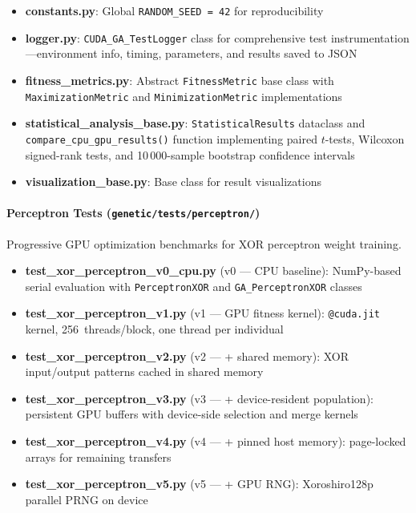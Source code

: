 \documentclass[a4paper,14pt]{extarticle}
\begin{document}
\begin{itemize}
  \item \textbf{constants.py}: Global \texttt{RANDOM\_SEED = 42} for reproducibility
  \item \textbf{logger.py}: \texttt{CUDA\_GA\_TestLogger} class for comprehensive test
        instrumentation---environment info, timing, parameters, and results saved to JSON
  \item \textbf{fitness\_metrics.py}: Abstract \texttt{FitnessMetric} base class with
        \texttt{MaximizationMetric} and \texttt{MinimizationMetric} implementations
  \item \textbf{statistical\_analysis\_base.py}: \texttt{StatisticalResults} dataclass and
        \texttt{compare\_cpu\_gpu\_results()} function implementing paired $t$-tests,
        Wilcoxon signed-rank tests, and 10\,000-sample bootstrap confidence intervals
  \item \textbf{visualization\_base.py}: Base class for result visualizations
\end{itemize}

\paragraph{Perceptron Tests (\texttt{genetic/tests/perceptron/})}

Progressive GPU optimization benchmarks for XOR perceptron weight training.

\begin{itemize}
  \item \textbf{test\_xor\_perceptron\_v0\_cpu.py} (v0 --- CPU baseline): NumPy-based serial
        evaluation with \texttt{PerceptronXOR} and \texttt{GA\_PerceptronXOR} classes
  \item \textbf{test\_xor\_perceptron\_v1.py} (v1 --- GPU fitness kernel):
        \texttt{@cuda.jit} kernel, 256~threads/block, one thread per individual
  \item \textbf{test\_xor\_perceptron\_v2.py} (v2 --- + shared memory): XOR input/output
        patterns cached in shared memory
  \item \textbf{test\_xor\_perceptron\_v3.py} (v3 --- + device-resident population):
        persistent GPU buffers with device-side selection and merge kernels
  \item \textbf{test\_xor\_perceptron\_v4.py} (v4 --- + pinned host memory): page-locked
        arrays for remaining transfers
  \item \textbf{test\_xor\_perceptron\_v5.py} (v5 --- + GPU RNG): Xoroshiro128p parallel
        PRNG on device
\end{itemize}
\end{document}
